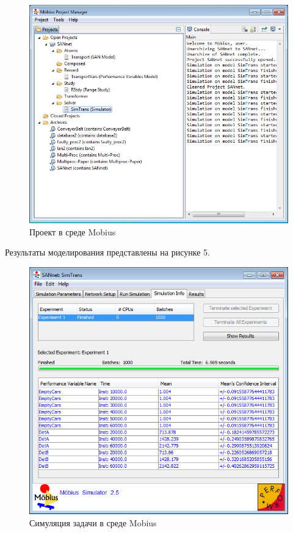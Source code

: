 \documentclass[a4paper, 12pt]{article}        %
\begin{document}
\begin{figure}[h!]
\centering
\includegraphics[scale=0.9]{res/pic004}
\caption{Проект в среде Mobius}
\end{figure}

Результаты моделирования представлены на рисунке 5. 

\begin{figure}[h!]
\centering
\includegraphics[scale=1]{res/pic005}
\caption{Симуляция задачи в среде Mobius}
\end{figure}
\end{document}
